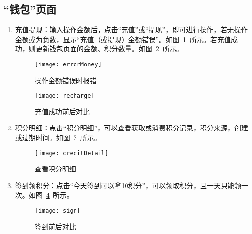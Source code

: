 \subsection{“钱包”页面}
\begin{enumerate}
\item {充值提现}：输入操作金额后，点击“充值”或“提现”，即可进行操作，若无操作金额或为负数，显示“充值（或提现）金额错误”。如图~\ref{fig:errorMoney}~所示。若充值成功，则更新钱包页面的金额、积分数量。如图~\ref{fig:recharge}~所示。
\begin{figure}[htbp]
    \centering
    \texttt{[image: errorMoney]}
    \caption{操作金额错误时报错}\label{fig:errorMoney}
\end{figure}
\begin{figure}[htbp]
    \centering
    \texttt{[image: recharge]}
    \caption{充值成功前后对比}\label{fig:recharge}
\end{figure} 
\item {积分明细}：点击“积分明细”，可以查看获取或消费积分记录，积分来源，创建或过期时间。如图~\ref{fig:creditDetail}~所示。
\begin{figure}[htbp]
    \centering
    \texttt{[image: creditDetail]}
    \caption{查看积分明细}\label{fig:creditDetail}
\end{figure} 
\item {签到领积分}：点击“今天签到可以拿10积分”，可以领取积分，且一天只能领一次。如图~\ref{fig:sign}~所示。
\begin{figure}[htbp]
    \centering
    \texttt{[image: sign]}
    \caption{签到前后对比}\label{fig:sign}
\end{figure} 
\end{enumerate}